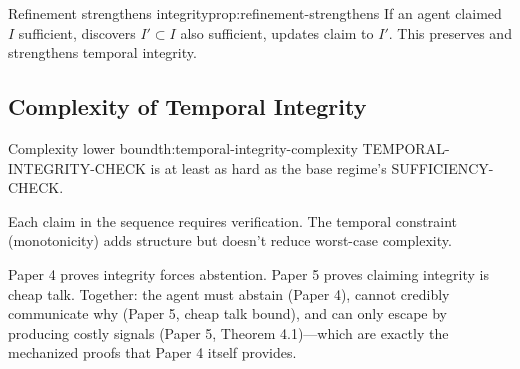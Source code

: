 
\begin{claim}{Refinement strengthens integrity}{prop:refinement-strengthens}
If an agent claimed $I$ sufficient, discovers $I' \subset I$ also sufficient, updates claim to $I'$. This preserves and strengthens temporal integrity.
\end{claim}


\subsection{Complexity of Temporal Integrity}

\begin{claim}{Complexity lower bound}{th:temporal-integrity-complexity}
TEMPORAL-INTEGRITY-CHECK is at least as hard as the base regime's SUFFICIENCY-CHECK.
\end{claim}

Each claim in the sequence requires verification. The temporal constraint (monotonicity) adds structure but doesn't reduce worst-case complexity.

Paper 4 proves integrity forces abstention. Paper 5 proves claiming integrity is cheap talk. Together: the agent must abstain (Paper 4), cannot credibly communicate why (Paper 5, cheap talk bound), and can only escape by producing costly signals (Paper 5, Theorem 4.1)---which are exactly the mechanized proofs that Paper 4 itself provides.
